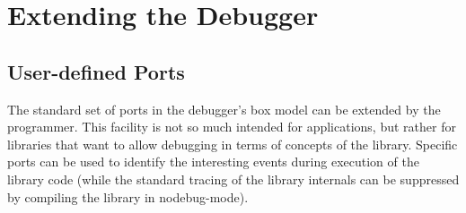 \section{Extending the Debugger}

\subsection{User-defined Ports}

The standard set of ports in the debugger's box model can be extended by
the programmer. This facility is not so much intended for applications,
but rather for libraries that want to allow debugging in terms of
concepts of the library. Specific ports can be used to identify the
interesting events during execution of the library code (while the standard
tracing of the library internals can be suppressed by compiling the
library in nodebug-mode).

